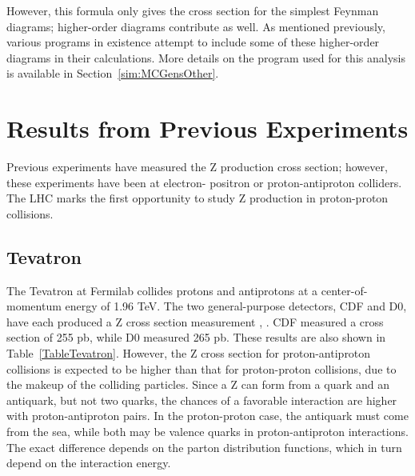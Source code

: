 


However, this formula only gives the cross section 
for the simplest Feynman diagrams; 
higher-order diagrams contribute as well.  
As mentioned previously, various programs 
in existence attempt to include some of these higher-order 
diagrams in their calculations.  
More details on the program used for this analysis 
is available in 
Section~\ref{sim:MCGensOther}. 





\section{Results from Previous Experiments}
\label{theory:prev}

Previous experiments have measured the 
Z production cross section; 
however, these experiments have been at electron-
positron or proton-antiproton colliders.  
The LHC marks the first opportunity to study 
Z production in proton-proton collisions.  %

\subsection{Tevatron}
\label{theory:tevatraon}

The Tevatron at Fermilab collides protons and antiprotons 
at a center-of-momentum energy of 1.96 TeV.  
The two general-purpose detectors, CDF and D0, 
have each produced a Z cross section measurement
\cite{Z-CDF}, 
\cite{Z-D0}.  
CDF measured a cross section of 255 pb, while D0 measured 265 pb.  
These results are also shown in 
Table~\ref{TableTevatron}.  
However, the Z cross section for proton-antiproton collisions 
is expected to be higher than that for proton-proton collisions, 
due to the makeup of the 
colliding particles.  
Since a Z can form from a quark and an antiquark, 
but not two quarks, the chances of a favorable 
interaction are higher with proton-antiproton pairs.  
In the proton-proton case, the antiquark must come from the sea, 
while both may be valence quarks in proton-antiproton interactions.  
The exact difference depends on the parton 
distribution functions, 
which in turn depend on the interaction energy.  

